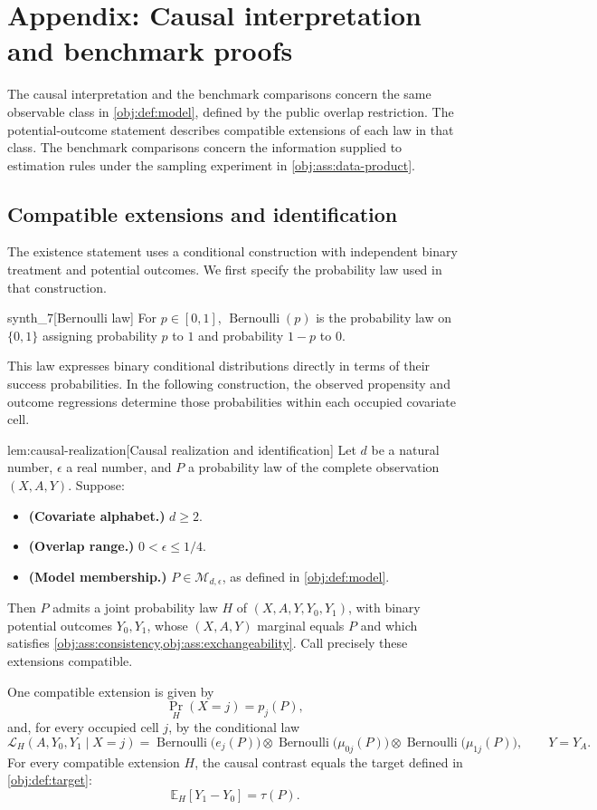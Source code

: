 \section{Appendix: Causal interpretation and benchmark proofs}

The causal interpretation and the benchmark comparisons concern the same observable class in \cref{obj:def:model}, defined by the public overlap restriction. The potential-outcome statement describes compatible extensions of each law in that class. The benchmark comparisons concern the information supplied to estimation rules under the sampling experiment in \cref{obj:ass:data-product}.

\subsection{Compatible extensions and identification}

The existence statement uses a conditional construction with independent binary treatment and potential outcomes. We first specify the probability law used in that construction.

\begin{definitionv}{synth_7}[Bernoulli law]
For \(p\in[0,1]\), \(\operatorname{Bernoulli}(p)\) is the probability law on \(\{0,1\}\) assigning probability \(p\) to \(1\) and probability \(1-p\) to \(0\).
\end{definitionv}

This law expresses binary conditional distributions directly in terms of their success probabilities. In the following construction, the observed propensity and outcome regressions determine those probabilities within each occupied covariate cell.

\begin{lemmav}{lem:causal-realization}[Causal realization and identification]
Let \(d\) be a natural number, \(\epsilon\) a real number, and \(P\) a probability law of the complete observation \((X,A,Y)\). Suppose:
\begin{itemize}
\item \textbf{(Covariate alphabet.)} \(d\ge 2\).
\item \textbf{(Overlap range.)} \(0<\epsilon\le 1/4\).
\item \textbf{(Model membership.)} \(P\in\mathcal M_{d,\epsilon}\), as defined in \cref{obj:def:model}.
\end{itemize}
Then \(P\) admits a joint probability law \(H\) of \((X,A,Y,Y_0,Y_1)\), with binary potential outcomes \(Y_0,Y_1\), whose \((X,A,Y)\) marginal equals \(P\) and which satisfies \cref{obj:ass:consistency,obj:ass:exchangeability}. Call precisely these extensions compatible.

One compatible extension is given by
\[
\Pr_H(X=j)=p_j(P),
\]
and, for every occupied cell \(j\), by the conditional law
\[
\mathcal L_H(A,Y_0,Y_1\mid X=j)
=
\operatorname{Bernoulli}\!\bigl(e_j(P)\bigr)
\otimes
\operatorname{Bernoulli}\!\bigl(\mu_{0j}(P)\bigr)
\otimes
\operatorname{Bernoulli}\!\bigl(\mu_{1j}(P)\bigr),
\qquad Y=Y_A.
\]
For every compatible extension \(H\), the causal contrast equals the target defined in \cref{obj:def:target}:
\[
\mathbb E_H[Y_1-Y_0]=\tau(P).
\]
\end{lemmav}

